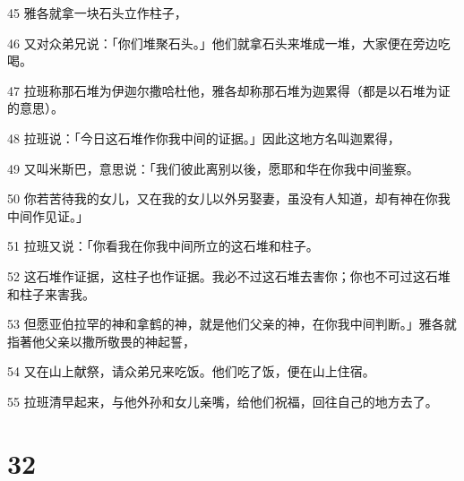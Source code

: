 \par 45 雅各就拿一块石头立作柱子，
\par 46 又对众弟兄说：「你们堆聚石头。」他们就拿石头来堆成一堆，大家便在旁边吃喝。
\par 47 拉班称那石堆为伊迦尔撒哈杜他，雅各却称那石堆为迦累得（都是以石堆为证的意思）。
\par 48 拉班说：「今日这石堆作你我中间的证据。」因此这地方名叫迦累得，
\par 49 又叫米斯巴，意思说：「我们彼此离别以後，愿耶和华在你我中间鉴察。
\par 50 你若苦待我的女儿，又在我的女儿以外另娶妻，虽没有人知道，却有神在你我中间作见证。」
\par 51 拉班又说：「你看我在你我中间所立的这石堆和柱子。
\par 52 这石堆作证据，这柱子也作证据。我必不过这石堆去害你；你也不可过这石堆和柱子来害我。
\par 53 但愿亚伯拉罕的神和拿鹤的神，就是他们父亲的神，在你我中间判断。」雅各就指著他父亲以撒所敬畏的神起誓，
\par 54 又在山上献祭，请众弟兄来吃饭。他们吃了饭，便在山上住宿。
\par 55 拉班清早起来，与他外孙和女儿亲嘴，给他们祝福，回往自己的地方去了。

\chapter{32}

